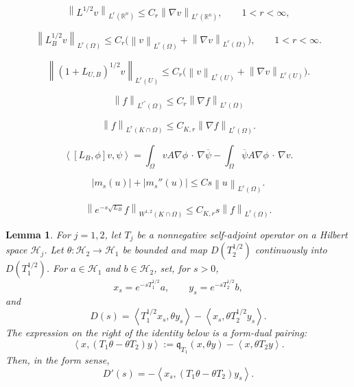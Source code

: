 \documentclass[10pt,a4paper]{amsart}
\newtheorem{lemma}{Lemma}
\newcommand\R{\mathbb{R}}
\newcommand{\abs}[1]{\left\lvert #1\right\rvert}
\newcommand{\cdo}{\, \cdot \,}
\newcommand{\ip}[2]{\left\langle #1,#2\right\rangle}
\newcommand{\norm}[2]{\left\lVert #1\right\rVert_{#2}}
\begin{document}
\begin{equation}\label{eq:whole-space-reverse}
 \norm{L^{1/2}v}{L^r(\R^n)}
 \leq C_r\norm{\nabla v}{L^r(\R^n)},\qquad 1<r<\infty,
\end{equation}

\begin{equation}\label{eq:localized-square-root}
 \norm{L_B^{1/2}v}{L^r(\Omega)}
 \leq C_r\bigl(\norm v{L^r(\Omega)}
                    +\norm{\nabla v}{L^r(\Omega)}\bigr),
 \qquad 1<r<\infty.
\end{equation}

\begin{equation}\label{eq:core-reverse}
 \norm{(1+L_{U,B})^{1/2}v}{L^r(U)}
 \leq C_r\bigl(\norm v{L^r(U)}+\norm{\nabla v}{L^r(U)}\bigr).
\end{equation}

\begin{equation}\label{eq:exterior-Sobolev}
 \norm f{L^{r^*}(\Omega)}\leq C_r\norm{\nabla f}{L^r(\Omega)}
\end{equation}

\begin{equation}\label{eq:exterior-local-Poincare}
 \norm f{L^r(K\cap\Omega)}\leq C_{K,r}\norm{\nabla f}{L^r(\Omega)}.
\end{equation}

\begin{equation}\label{eq:form-commutator}
 \ip{[L_B,\phi]v}{\psi}
 =\int_\Omega vA\nabla\phi\mathbin{\cdo}\nabla\overline\psi
 -\int_\Omega\overline\psi A\nabla\phi\mathbin{\cdo}\nabla v.
\end{equation}

\begin{equation}\label{eq:m-small}
 \abs{m_s(u)}+\abs{m_s''(u)}
 \leq Cs\norm u{L^r(\Omega)}.
\end{equation}

\begin{equation}\label{eq:domain-small-off}
 \norm{e^{-s\sqrt{L_B}}f}{W^{1,2}(K\cap\Omega)}
 \leq C_{K,r}s\norm f{L^r(\Omega)}.
\end{equation}

\begin{lemma}\label{lem:Wronskian}
For $j=1,2$, let $T_j$ be a nonnegative self-adjoint operator on a Hilbert
space $\mathcal H_j$.  Let $\theta:\mathcal H_2\to\mathcal H_1$ be bounded
and map $D(T_2^{1/2})$ continuously into $D(T_1^{1/2})$.  For
$a\in\mathcal H_1$ and $b\in\mathcal H_2$, set, for $s>0$,
\[
 x_s=e^{-sT_1^{1/2}}a,
 \qquad y_s=e^{-sT_2^{1/2}}b,
\]
and
\[
 D(s)=\ip{T_1^{1/2}x_s}{\theta y_s}
      -\ip{x_s}{\theta T_2^{1/2}y_s}.
\]
The expression on the right of the identity below is a form-dual pairing:
\[
 \ip{x}{(T_1\theta-\theta T_2)y}
 :=\mathfrak q_{T_1}(x,\theta y)-\ip{x}{\theta T_2y}.
\]
Then, in the form sense,
\begin{equation}\label{eq:Wronskian-derivative}
 D'(s)=-\ip{x_s}{(T_1\theta-\theta T_2)y_s}.
\end{equation}
\end{lemma}
\end{document}

